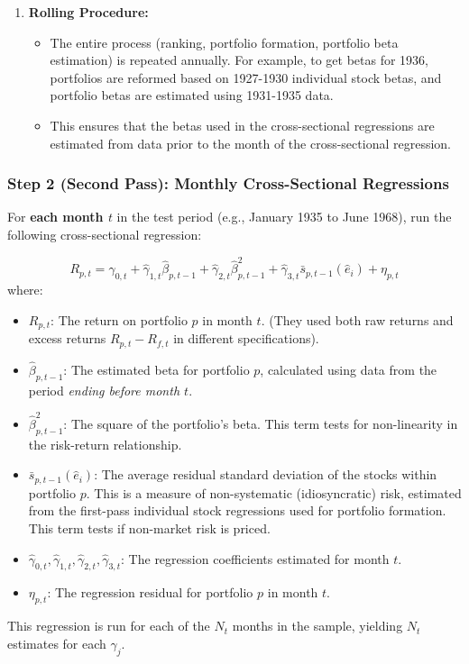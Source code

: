 \documentclass[10pt]{beamer}
\begin{document}
\begin{frame}[allowframebreaks]
\begin{enumerate}
    \item \textbf{Rolling Procedure:}
      \begin{itemize}
        \item The entire process (ranking, portfolio formation, portfolio beta estimation) is repeated annually. For example, to get betas for 1936, portfolios are reformed based on 1927-1930 individual stock betas, and portfolio betas are estimated using 1931-1935 data.
        \item This ensures that the betas used in the cross-sectional regressions are estimated from data prior to the month of the cross-sectional regression.
      \end{itemize}
  \end{enumerate}
\end{frame}

\begin{frame}[allowframebreaks]
  \frametitle{Step 2 (Second Pass): Monthly Cross-Sectional Regressions}
  For \textbf{each month $t$} in the test period (e.g., January 1935 to June 1968), run the following cross-sectional regression:

  \[ R_{p,t} = \hat{\gamma}_{0,t} + \hat{\gamma}_{1,t} \hat{\beta}_{p,t-1} + \hat{\gamma}_{2,t} \hat{\beta}_{p,t-1}^2 + \hat{\gamma}_{3,t} \bar{s}_{p,t-1}(\hat{e}_i) + \eta_{p,t} \]
  where:
  \begin{itemize}
    \item $R_{p,t}$: The return on portfolio $p$ in month $t$. (They used both raw returns and excess returns $R_{p,t} - R_{f,t}$ in different specifications).
    \item $\hat{\beta}_{p,t-1}$: The estimated beta for portfolio $p$, calculated using data from the period \textit{ending before month $t$}.
    \item $\hat{\beta}_{p,t-1}^2$: The square of the portfolio's beta. This term tests for non-linearity in the risk-return relationship.
    \item $\bar{s}_{p,t-1}(\hat{e}_i)$: The average residual standard deviation of the stocks within portfolio $p$. This is a measure of non-systematic (idiosyncratic) risk, estimated from the first-pass individual stock regressions used for portfolio formation. This term tests if non-market risk is priced.
    \item $\hat{\gamma}_{0,t}, \hat{\gamma}_{1,t}, \hat{\gamma}_{2,t}, \hat{\gamma}_{3,t}$: The regression coefficients estimated for month $t$.
    \item $\eta_{p,t}$: The regression residual for portfolio $p$ in month $t$.
  \end{itemize}
  This regression is run for each of the $N_t$ months in the sample, yielding $N_t$ estimates for each $\gamma_j$.
\end{frame}
\end{document}
